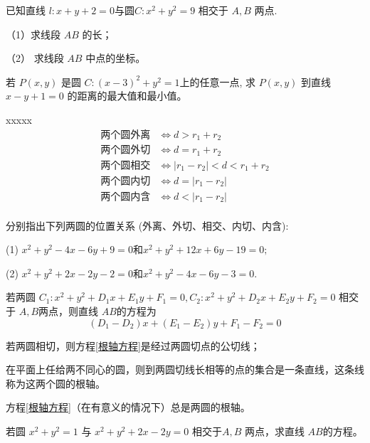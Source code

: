 \begin{example}
    已知直线 $ l: x+y+2=0  $与圆$  C: x^{2}+y^{2}=9$  相交于 $ A, B$  两点.

    （1）求线段 $ A B $ 的长；

    （2） 求线段  $A B $ 中点的坐标。
\end{example}

\begin{example}
    若  $P(x, y) $ 是圆 $ C:(x-3)^{2}+y^{2}=1  $上的任意一点, 求 $ P(x, y) $ 到直线 $ x-y+1=0 $ 的距离的最大值和最小值。
\end{example}

\begin{definition}
    
\end{definition}
\begin{theorem}
xxxxx
\vspace*{-0.3cm}
    \begin{align*}
        \text{两个圆外离} & \Leftrightarrow d > r_{1} + r_{2} \\
        \text{两个圆外切} & \Leftrightarrow d = r_{1} + r_{2} \\
        \text{两个圆相交} & \Leftrightarrow \left| r_{1} - r_{2} \right| < d < r_{1} + r_{2} \\
        \text{两个圆内切} & \Leftrightarrow d = \left| r_{1} - r_{2} \right| \\
        \text{两个圆内含} & \Leftrightarrow d < \left| r_{1} - r_{2} \right| \\
    \end{align*}
    \vspace*{-1.4cm}
\end{theorem}
\begin{exercise}
    分别指出下列两圆的位置关系 (外离、外切、相交、内切、内含):

(1) $ x^{2}+y^{2}-4 x-6 y+9=0 \text{和}   x^{2}+y^{2}+12 x+6 y-19=0 ;$

(2) $ x^{2}+y^{2}+2 x-2 y-2=0 \text{和}  x^{2}+y^{2}-4 x-6 y-3=0 .$
\end{exercise}

\begin{theorem}
    若两圆  $C_{1}: x^{2}+y^{2}+D_{1} x+E_{1} y+F_{1}=0, C_{2}: x^{2}+y^{2}+D_{2} x+E_{2} y+F_{2}=0  $
    相交于 $ A, B  $两点，则直线 $ A B  $的方程为 
    \begin{equation}\label{根轴方程}
         \left(D_{1}-D_{2}\right) x+\left(E_{1}-E_{2}\right) y+F_{1}-F_{2}=0 
    \end{equation}

    若两圆相切，则方程\ref{根轴方程}是经过两圆切点的公切线；

    \begin{definition}[根轴]
        在平面上任给两不同心的圆，则到两圆切线长相等的点的集合是一条直线，这条线称为这两个圆的根轴。
    \end{definition}

    方程\ref{根轴方程}（在有意义的情况下）总是两圆的根轴。
\end{theorem}
\begin{exercise}
     若圆 $x^{2}+y^{2}=1 $ 与 $ x^{2}+y^{2}+2 x-2 y=0 $ 相交于$  A ,B $ 两点，求直线  $A B $的方程。
\end{exercise}

